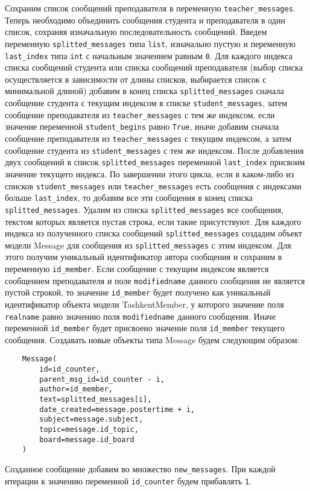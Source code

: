 \documentclass[12pt, a4paper, oneside]{article}
\begin{document}
Сохраним список сообщений преподавателя в переменную \texttt{teacher\_messages}. Теперь необходимо объединить сообщения студента и преподавателя в один список, сохраняя изначальную последовательность сообщений. Введем переменную \texttt{splitted\_messages} типа \texttt{list}, изначально пустую и переменную \texttt{last\_index} типа \texttt{int} с начальным значением равным \texttt{0}. Для каждого индекса списка сообщений студента или списка сообщений преподавателя (выбор списка осуществляется в зависимости от длины списков, выбирается список с минимальной длиной) добавим в конец списка \texttt{splitted\_messages} сначала сообщение студента с текущим индексом в списке \texttt{student\_messages}, затем сообщение преподавателя из \texttt{teacher\_messages} с тем же индексом, если значение переменной \texttt{student\_begins} равно \texttt{True}, иначе добавим сначала сообщение преподавателя из \texttt{teacher\_messages} с текущим индексом, а затем сообщение студента из \texttt{student\_messages} с тем же индексом. После добавления двух сообщений в список \texttt{splitted\_messages} переменной \texttt{last\_index} присвоим значение текущего индекса. По завершении этого цикла, если в каком-либо из списков \texttt{student\_messages} или \texttt{teacher\_messages} есть сообщения с индексами больше \texttt{last\_index}, то добавим все эти сообщения в конец списка \texttt{splitted\_messages}. Удалим из списка \texttt{splitted\_messages} все сообщения, текстом которых является пустая строка, если такие присутствуют. Для каждого индекса из полученного списка сообщений \texttt{splitted\_messages} создадим объект модели Message для сообщения из \texttt{splitted\_messages} с этим индексом. Для этого получим уникальный идентификатор автора сообщения и сохраним в переменную \texttt{id\_member}. Если сообщение с текущим индексом является сообщением преподавателя и поле \texttt{modifiedname} данного сообщения не является пустой строкой, то значение \texttt{id\_member} будет получено как уникальный идентификатор объекта модели TashkentMember, у которого значение поля \texttt{realname} равно значению поля \texttt{modifiedname} данного сообщения. Иначе переменной \texttt{id\_member} будет присвоено значение поля \texttt{id\_member} текущего сообщения. Создавать новые объекты типа Message будем следующим образом:
\begin{verbatim}
    Message(
        id=id_counter,
        parent_msg_id=id_counter - i,
        author=id_member,
        text=splitted_messages[i],
        date_created=message.postertime + i,
        subject=message.subject,
        topic=message.id_topic,
        board=message.id_board
    )
\end{verbatim}
Созданное сообщение добавим во множество \texttt{new\_messages}. При каждой итерации к значению переменной \texttt{id\_counter} будем прибавлять \texttt{1}.
\end{document}
